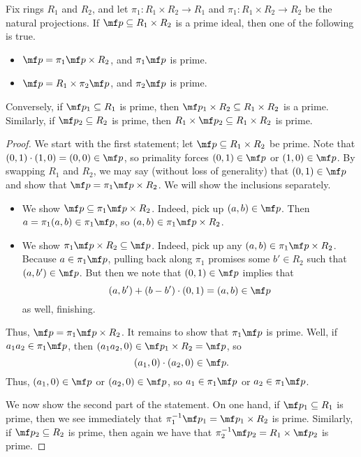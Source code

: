 \begin{lemma} \label{lem:primesinprods}
	Fix rings $R_1$ and $R_2$, and let $\pi_1:R_1\times R_2\to R_1$ and $\pi_1:R_1\times R_2\to R_2$ be the natural projections. If $\mf p\subseteq R_1\times R_2$ is a prime ideal, then one of the following is true.
	\begin{itemize}
		\item $\mf p=\pi_1\mf p\times R_2$, and $\pi_1\mf p$ is prime.
		\item $\mf p=R_1\times\pi_2\mf p$, and $\pi_2\mf p$ is prime.
	\end{itemize}
	Conversely, if $\mf p_1\subseteq R_1$ is prime, then $\mf p_1\times R_2\subseteq R_1\times R_2$ is a prime. Similarly, if $\mf p_2\subseteq R_2$ is prime, then $R_1\times\mf p_2\subseteq R_1\times R_2$ is prime.
\end{lemma}
\begin{proof}
	We start with the first statement; let $\mf p\subseteq R_1\times R_2$ be prime. Note that $(0,1)\cdot(1,0)=(0,0)\in\mf p$, so primality forces $(0,1)\in\mf p$ or $(1,0)\in\mf p$. By swapping $R_1$ and $R_2$, we may say (without loss of generality) that $(0,1)\in\mf p$ and show that $\mf p=\pi_1\mf p\times R_2$. We will show the inclusions separately.
	\begin{itemize}
		\item We show $\mf p\subseteq\pi_1\mf p\times R_2$. Indeed, pick up $(a,b)\in\mf p$. Then $a=\pi_1(a,b)\in\pi_1\mf p$, so $(a,b)\in\pi_1\mf p\times R_2$.
		\item We show $\pi_1\mf p\times R_2\subseteq\mf p$. Indeed, pick up any $(a,b)\in\pi_1\mf p\times R_2$. Because $a\in\pi_1\mf p$, pulling back along $\pi_1$ promises some $b'\in R_2$ such that $(a,b')\in\mf p$. But then we note that $(0,1)\in\mf p$ implies that
		\[(a,b')+(b-b')\cdot(0,1)=(a,b)\in\mf p\]
		as well, finishing.
	\end{itemize}
	Thus, $\mf p=\pi_1\mf p\times R_2$. It remains to show that $\pi_1\mf p$ is prime. Well, if $a_1a_2\in\pi_1\mf p$, then $(a_1a_2,0)\in\mf p_1\times R_2=\mf p$, so
	\[(a_1,0)\cdot(a_2,0)\in\mf p.\]
	Thus, $(a_1,0)\in\mf p$ or $(a_2,0)\in\mf p$, so $a_1\in\pi_1\mf p$ or $a_2\in\pi_1\mf p$.

	We now show the second part of the statement. On one hand, if $\mf p_1\subseteq R_1$ is prime, then we see immediately that $\pi_1^{-1}\mf p_1=\mf p_1\times R_2$ is prime. Similarly, if $\mf p_2\subseteq R_2$ is prime, then again we have that $\pi_2^{-1}\mf p_2=R_1\times\mf p_2$ is prime.
\end{proof}
